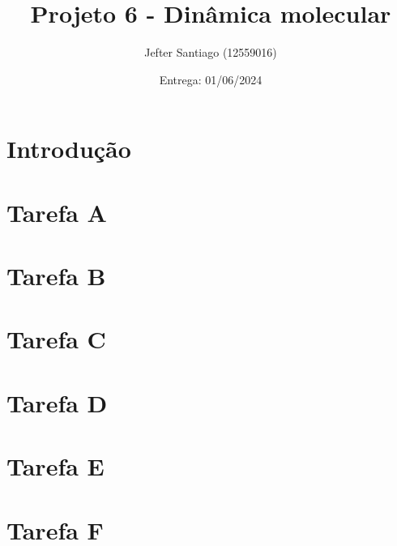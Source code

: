 \documentclass[a4paper, 13pt]{article}
\title{\color{blue}Projeto 6 - Dinâmica molecular}
\author{Jefter Santiago (12559016)}
\date{Entrega: 01/06/2024}
\begin{document}
\maketitle
\section{Introdução}


\section{Tarefa A}

\section{Tarefa B}

\section{Tarefa C}

\section{Tarefa D}

\section{Tarefa E}

\section{Tarefa F}

\end{document}
